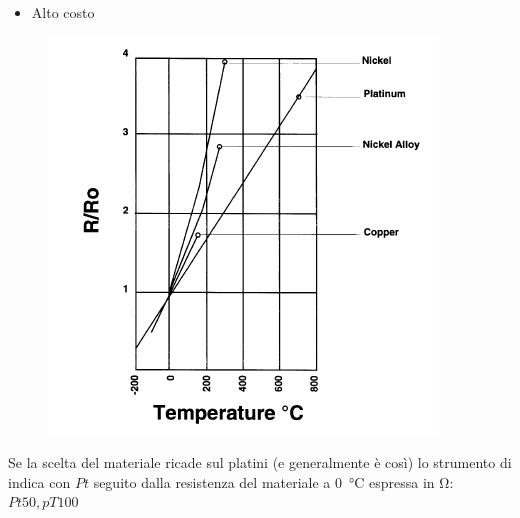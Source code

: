 \documentclass[a4paper, 15pt]{article}
\newcommand{\xmark}{\ding{55}}
\begin{document}
\begin{adjustwidth}{2in}{}
\begin{itemize}
\begin{itemize}[label = \textcolor{red}{\xmark}]
		\item Alto costo
		\end{itemize}
	\end{itemize}
	\begin{figure}[H]
		\centering
		\includegraphics[width=0.3\linewidth]{immagini/screenshot006}
		\label{fig:screenshot006}
	\end{figure}
	Se la scelta del materiale ricade sul platini (e generalmente è così) lo strumento di indica con $Pt$ seguito dalla resistenza del materiale a \SI{0}{\celsius} espressa in \unit{\ohm}: \(Pt50, pT100\)
	

\end{adjustwidth}
\end{document}
